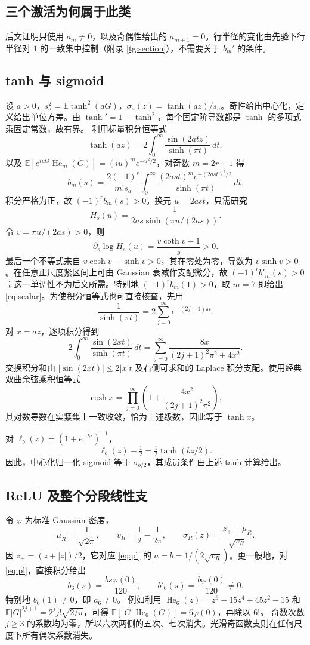 \documentclass[a4paper]{tufte-handout}
\newcommand{\E}{\mathbb E}
\begin{document}
\begin{fullwidth}
\section{三个激活为何属于此类}
后文证明只使用 $a_m\neq0$，以及奇偶性给出的 $a_{m\pm1}=0$。行半径的变化由先验下行半径对 $1$ 的一致集中控制（附录 \ref{tg:section}），不需要关于 $b_m'$ 的条件。

\subsection{tanh 与 sigmoid}
设 $a>0$，$s_a^2=\E\tanh^2(aG)$，$\sigma_a(z)=\tanh(az)/s_a$。奇性给出中心化，定义给出单位方差。由 $\tanh'=1-\tanh^2$，每个固定阶导数都是 $\tanh$ 的多项式乘固定常数，故有界。
利用标量积分恒等式
\[
\tanh(az)=2\int_0^\infty\frac{\sin(2atz)}{\sinh(\pi t)}\,dt,
\]
以及
$\E[e^{iuG}\operatorname{He}_m(G)]=(iu)^m e^{-u^2/2}$，对奇数 $m=2r+1$ 得
\begin{equation}\label{eq:tanh-hermite}
b_m(s)=\frac{2(-1)^r}{m!s_a}
\int_0^\infty\frac{(2ast)^m e^{-(2ast)^2/2}}{\sinh(\pi t)}\,dt.
\end{equation}
积分严格为正，故 $(-1)^rb_m(s)>0$。换元 $u=2ast$，只需研究
\[
H_s(u)=\frac1{2as\sinh(\pi u/(2as))}.
\]
令 $v=\pi u/(2as)>0$，则
\[
\partial_s\log H_s(u)=\frac{v\coth v-1}{s}>0.
\]
最后一个不等式来自 $v\cosh v-\sinh v>0$，其在零处为零，导数为 $v\sinh v>0$。在任意正尺度紧区间上可由 Gaussian 衰减作支配微分，故 $(-1)^rb'_m(s)>0$；这一单调性不为后文所需。特别地 $(-1)^rb_m(1)>0$，取 $m=7$ 即给出 \eqref{eq:scalar}。为使积分恒等式也可直接核查，先用
\[
\frac1{\sinh(\pi t)}=2\sum_{j=0}^\infty e^{-(2j+1)\pi t}.
\]
对 $x=az$，逐项积分得到
\[
2\int_0^\infty\frac{\sin(2xt)}{\sinh(\pi t)}\,dt
=\sum_{j=0}^\infty\frac{8x}{(2j+1)^2\pi^2+4x^2}.
\]
交换积分和由 $|\sin(2xt)|\le2|x|t$ 及右侧可求和的 Laplace 积分支配。使用经典双曲余弦乘积恒等式
\[
\cosh x=\prod_{j=0}^\infty\left(1+\frac{4x^2}{(2j+1)^2\pi^2}\right),
\]
其对数导数在实紧集上一致收敛，恰为上述级数，因此等于 $\tanh x$。

对 $\ell_b(z)=(1+e^{-bz})^{-1}$，
\[
\ell_b(z)-\tfrac12=\tfrac12\tanh(bz/2).
\]
因此，中心化归一化 sigmoid 等于 $\sigma_{b/2}$，其成员条件由上述 tanh 计算给出。

\subsection{ReLU 及整个分段线性支}
令 $\varphi$ 为标准 Gaussian 密度，
\[
\mu_R=\frac1{\sqrt{2\pi}},\qquad
v_R=\frac12-\frac1{2\pi},\qquad
\sigma_R(z)=\frac{z_+-\mu_R}{\sqrt{v_R}}.
\]
因 $z_+=(z+|z|)/2$，它对应 \eqref{eq:pl} 的
$a=b=1/(2\sqrt{v_R})$。更一般地，对 \eqref{eq:pl}，直接积分给出
\[
b_6(s)=\frac{bs\varphi(0)}{120},\qquad
b'_6(s)=\frac{b\varphi(0)}{120}\ne0.
\]
特别地 $b_6(1)\neq0$，即 $a_6\neq0$。
例如利用 $\operatorname{He}_6(z)=z^6-15z^4+45z^2-15$ 和
$\E|G|^{2j+1}=2^jj!\sqrt{2/\pi}$，可得
$\E[|G|\operatorname{He}_6(G)]=6\varphi(0)$，再除以 $6!$。
奇数次数 $j\ge3$ 的系数均为零，所以六次两侧的五次、七次消失。光滑奇函数支则在任何尺度下所有偶次系数消失。


\end{fullwidth}
\end{document}
